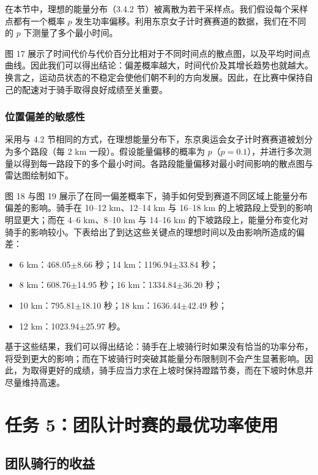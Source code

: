\documentclass[11pt,a4paper]{ctexart}
\begin{document}
在本节中，理想的能量分布（3.4.2 节）被离散为若干采样点。我们假设每个采样点都有一个概率 $p$ 发生功率偏移。利用东京女子计时赛赛道的数据，我们在不同的 $p$ 下测量了多个最小时间。

图 17 展示了时间代价与代价百分比相对于不同时间点的散点图，以及平均时间点曲线。因此我们可以得出结论：偏差概率越大，时间代价及其增长趋势也就越大。换言之，运动员状态的不稳定会使他们朝不利的方向发展。因此，在比赛中保持自己的配速对于骑手取得良好成绩至关重要。

\subsubsection{位置偏差的敏感性}

采用与 4.2 节相同的方式，在理想能量分布下，东京奥运会女子计时赛赛道被划分为多个路段（每 2 km 一段）。假设能量偏移的概率为 $p$（$p=0.1$），并进行多次测量以得到每一路段下的多个最小时间。各路段能量偏移对最小时间影响的散点图与雷达图绘制如下。

图 18 与图 19 展示了在同一偏差概率下，骑手如何受到赛道不同区域上能量分布偏差的影响。骑手在 10--12 km、12--14 km 与 16--18 km 的上坡路段上受到的影响明显更大；而在 4--6 km、8--10 km 与 14--16 km 的下坡路段上，能量分布变化对骑手的影响较小。下表给出了到达这些关键点的理想时间以及由影响所造成的偏差：

\begin{itemize}
\item 6 km：468.05$\pm$8.66 秒；14 km：1196.94$\pm$33.84 秒；
\item 8 km：608.76$\pm$14.95 秒；16 km：1334.84$\pm$36.20 秒；
\item 10 km：795.81$\pm$18.10 秒；18 km：1636.44$\pm$42.49 秒；
\item 12 km：1023.94$\pm$25.97 秒。
\end{itemize}

基于这些结果，我们可以得出结论：骑手在上坡骑行时如果没有恰当的功率分布，将受到更大的影响；而在下坡骑行时突破其能量分布限制则不会产生显著影响。因此，为取得更好的成绩，骑手应当力求在上坡时保持蹬踏节奏，而在下坡时休息并尽量维持高速。

\section{任务 5：团队计时赛的最优功率使用}

\subsection{团队骑行的收益}
\end{document}
